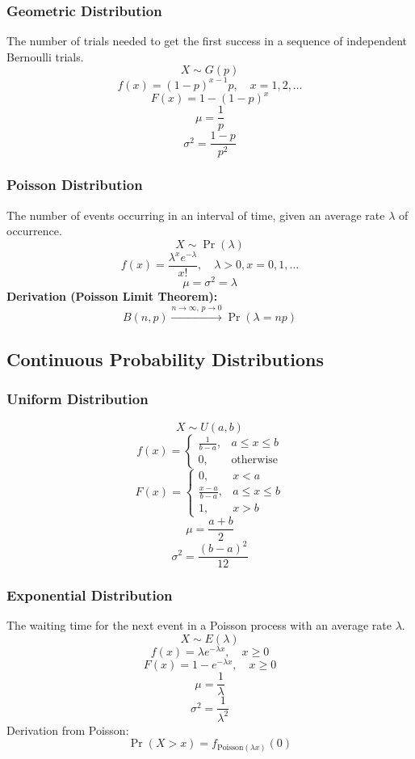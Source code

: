 \documentclass{article}
\begin{document}
\subsubsection{Geometric Distribution}
The number of trials needed to get the first success in a sequence of independent Bernoulli trials.
\[ X \sim G(p) \]
\[ f(x) = (1-p)^{x-1}p, \quad x=1,2,\dots \]
\[ F(x) = 1 - (1-p)^x \]
\[ \mu = \frac{1}{p} \]
\[ \sigma^2 = \frac{1-p}{p^2} \]

\subsubsection{Poisson Distribution}
The number of events occurring in an interval of time, given an average rate \( \lambda \) of occurrence.
\[ X \sim \Pr(\lambda) \]
\[ f(x) = \frac{\lambda^x e^{-\lambda}}{x!}, \quad \lambda>0, x=0,1,\dots \]
\[ \mu = \sigma^2 = \lambda \]
\textbf{Derivation (Poisson Limit Theorem):}
\[
    B(n, p) \xrightarrow{n \to \infty,\, p \to 0} \Pr(\lambda = np)
\]

\subsection{Continuous Probability Distributions}

\subsubsection{Uniform Distribution}
\[
    X \sim U(a, b)
\]
\[
    f(x) =
    \begin{cases}
        \frac{1}{b-a}, & a \leq x \leq b \\
        0, & \text{otherwise}
    \end{cases}
\]
\[
    F(x) =
    \begin{cases}
        0, & x < a \\
        \frac{x-a}{b-a}, & a \leq x \leq b \\
        1, & x > b
    \end{cases}
\]
\[
    \mu = \frac{a+b}{2}
\]
\[
    \sigma^2 = \frac{(b-a)^2}{12}
\]

\subsubsection{Exponential Distribution}
The waiting time for the next event in a Poisson process with an average rate \( \lambda \).
\[ X \sim E(\lambda) \]
\[
    f(x) = \lambda e^{-\lambda x}, \quad x \geq 0
\]
\[
    F(x) = 1 - e^{-\lambda x}, \quad x \geq 0
\]
\[
    \mu = \frac{1}{\lambda}
\]
\[
    \sigma^2 = \frac{1}{\lambda^2}
\]
Derivation from Poisson:
\[
    \Pr(X>x) = f_{\text{Poisson}(\lambda x)}(0)
\]
\end{document}
